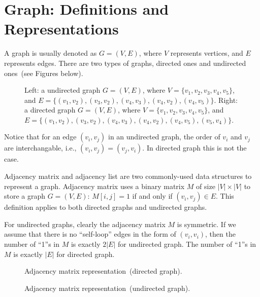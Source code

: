 \setcounter{definition}{0} \setcounter{property}{0} \setcounter{claim}{0} \setcounter{fact}{0} \setcounter{corollary}{0} \setcounter{figure}{0}
\section{Graph: Definitions and Representations}


A graph is usually denoted as $G = (V, E)$, where $V$ represents vertices, and $E$ represents edges.
There are two types of graphs, directed ones and undirected ones~(see Figures below).

\begin{figure}[h!]
\centering{}
\caption{Left: a undirected graph $G = (V, E)$, where $V = \{v_1, v_2, v_3, v_4, v_5\}$,
and $E = \{(v_1, v_2), (v_3, v_2), (v_4, v_3), (v_4, v_2), (v_4, v_5)\}$.
Right: a directed graph $G = (V, E)$, where $V = \{v_1, v_2, v_3, v_4, v_5\}$,
and $E = \{(v_1, v_2), (v_3, v_2), (v_4, v_3), (v_4, v_2), (v_4, v_5), (v_5, v_4)\}$.}
\label{fig:graphs}
\end{figure}

Notice that for an edge $(v_i, v_j)$ in an undirected graph, the order of $v_i$ and $v_j$ are interchangable,
i.e., $(v_i, v_j) = (v_j, v_i)$. In directed graph this is not the case.


Adjacency matrix and adjacency list are two commonly-used data structures to represent a graph.
Adjacency matrix uses a binary matrix $M$ of size $|V|\times |V|$ to store a graph $G = (V, E)$:
$M[i,j] = 1$ if and only if $(v_i, v_j) \in E$. This definition applies to both directed graphs and undirected graphs.

For undirected graphs, clearly the adjacency matrix $M$ is symmetric. 
If we assume that there is no ``self-loop'' edges in the form of $(v_i, v_i)$, 
then the number of ``1''s in $M$ is exactly $2|E|$ for undirected graph.
The number of ``1''s in $M$ is exactly $|E|$ for directed graph. 

\begin{figure}[h!]
\centering{}
\caption{Adjacency matrix representation~(directed graph).}
\end{figure}

\begin{figure}[h!]
\centering{}
\caption{Adjacency matrix representation~(undirected graph).}
\end{figure}

